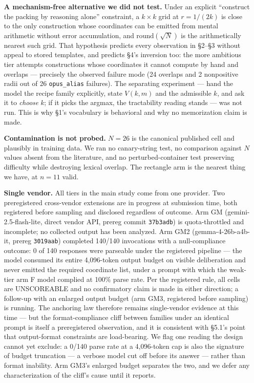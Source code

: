 \documentclass[11pt]{article}
\begin{document}
\textbf{A mechanism-free alternative we did not test.} Under an explicit ``construct the packing by
reasoning alone'' constraint, a $k \times k$ grid at $r = 1/(2k)$ is close to the only construction whose
coordinates can be emitted from mental arithmetic without error accumulation, and $\mathrm{round}(\sqrt{N})$ is
the arithmetically nearest such grid. That hypothesis predicts every observation in \S2--\S3
without appeal to stored templates, and predicts \S4's inversion too: the more ambitious tier
attempts constructions whose coordinates it cannot compute by hand and overlaps --- precisely the
observed failure mode (24 overlaps and 2 nonpositive radii out of 26 \texttt{opus\_alias} failures). The
separating experiment --- hand the model the recipe family explicitly, state $V(k, m)$ and the
admissible $k$, and ask it to \textit{choose} $k$; if it picks the argmax, the tractability reading stands
--- was not run. This is why \S1's vocabulary is behavioral and why no memorization claim is made.

\textbf{Contamination is not probed.} $N = 26$ is the canonical published cell and plausibly in
training data. We ran no canary-string test, no comparison against $N$ values absent from the
literature, and no perturbed-container test preserving difficulty while destroying lexical
overlap. The rectangle arm is the nearest thing we have, at $n = 11$ valid.

\textbf{Single vendor.} All tiers in the main study come from one provider. Two preregistered
cross-vendor extensions are in progress at submission time, both registered before sampling and
disclosed regardless of outcome. Arm GM (gemini-2.5-flash-lite, direct vendor API,
prereg commit \texttt{37b3adb}) is quota-throttled and incomplete; no collected output has been
analyzed. Arm GM2 (gemma-4-26b-a4b-it, prereg \texttt{3019aab}) completed 140/140 invocations with a
null-compliance outcome: 0 of 140 responses were parseable under the registered pipeline ---
the model consumed its entire 4{,}096-token output budget on visible deliberation and never
emitted the required coordinate list, under a prompt with which the weak-tier arm F model
complied at 100\% parse rate. Per the registered rule, all cells are UNSCOREABLE and no
confirmatory claim is made in either direction; a follow-up with an enlarged output budget
(arm GM3, registered before sampling) is running. The anchoring law therefore remains
single-vendor evidence at this time --- but the format-compliance cliff between families under
an identical prompt is itself a preregistered observation, and it is consistent with \S5.1's
point that output-format constraints are load-bearing. We flag one reading the design cannot
yet exclude: a 0/140 parse rate at a 4{,}096-token cap is also the signature of budget
truncation --- a verbose model cut off before its answer --- rather than format inability. Arm
GM3's enlarged budget separates the two, and we defer any characterization of the cliff's
cause until it reports.
\end{document}
